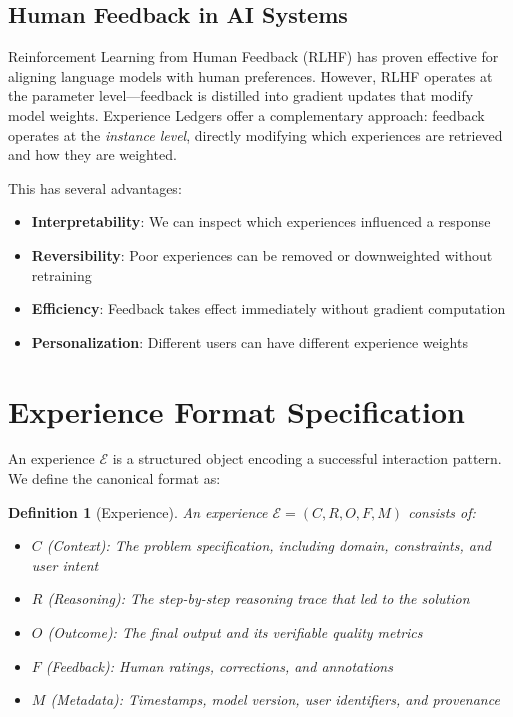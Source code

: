 \documentclass[11pt,letterpaper]{article}
\newtheorem{definition}{Definition}[section]
\begin{document}
\subsection{Human Feedback in AI Systems}

Reinforcement Learning from Human Feedback (RLHF) has proven effective for aligning language models with human preferences. However, RLHF operates at the parameter level---feedback is distilled into gradient updates that modify model weights. Experience Ledgers offer a complementary approach: feedback operates at the \emph{instance level}, directly modifying which experiences are retrieved and how they are weighted.

This has several advantages:
\begin{itemize}
    \item \textbf{Interpretability}: We can inspect which experiences influenced a response
    \item \textbf{Reversibility}: Poor experiences can be removed or downweighted without retraining
    \item \textbf{Efficiency}: Feedback takes effect immediately without gradient computation
    \item \textbf{Personalization}: Different users can have different experience weights
\end{itemize}

\section{Experience Format Specification}
\label{sec:format}

An experience $\mathcal{E}$ is a structured object encoding a successful interaction pattern. We define the canonical format as:

\begin{definition}[Experience]
An experience $\mathcal{E} = (C, R, O, F, M)$ consists of:
\begin{itemize}
    \item $C$ (Context): The problem specification, including domain, constraints, and user intent
    \item $R$ (Reasoning): The step-by-step reasoning trace that led to the solution
    \item $O$ (Outcome): The final output and its verifiable quality metrics
    \item $F$ (Feedback): Human ratings, corrections, and annotations
    \item $M$ (Metadata): Timestamps, model version, user identifiers, and provenance
\end{itemize}
\end{definition}
\end{document}
